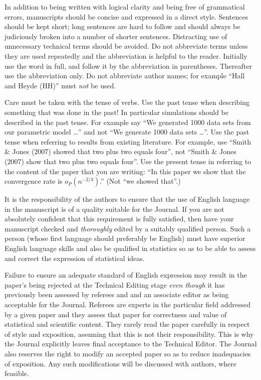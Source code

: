 \documentclass[times, doublespace]{anzsauth}
\begin{document}
In addition to being written with logical clarity and being free
of grammatical errors, manuscripts should be concise and expressed
in a direct style. Sentences should be kept short; long sentences
are hard to follow and should always be judiciously broken into
a number of shorter sentences.  Distracting use of unnecessary
technical terms should be avoided.  Do not abbreviate terms
unless they are used repeatedly and the abbreviation is helpful
to the reader. Initially use the word in full, and follow it by
the abbreviation in parentheses.  Thereafter use the abbreviation
only. Do not abbreviate author names; for example ``Hall and Heyde
(HH)'' must \emph{not} be used.

Care must be taken with the tense of verbs.  Use the past tense
when describing something that was done in the past! In particular
simulations should be described in the past tense.  For example say
``We generated 1000 data sets from our parametric model \ldots''
and not ``We generate 1000 data sets \ldots''.  Use the past tense
when referring to results from existing literature.  For example,
use ``Smith \& Jones (2007) showed that two plus two equals four'',
not ``Smith \& Jones (2007) show that two plus two equals four''.
Use the present tense in referring to the content of the paper that
you are writing: ``In this paper we show that the convergence rate
is $o_P(n^{-2/3})$.''  (Not ``we showed that''.)

It is the responsibility of the authors to ensure that the use
of English language in the manuscript is of a quality suitable
for the Journal. If you are not absolutely confident that this
requirement is fully satisfied, then have your manuscript checked
and \emph{thoroughly} edited by a suitably qualified person.
Such a person (whose first language should preferably be English)
must have superior English language skills and also be qualified
in statistics so as to be able to assess and correct the expression
of statistical ideas.

Failure to ensure an adequate standard of English expression may
result in the paper's being rejected at the Technical Editing stage
\emph{even though} it has previously been assessed by referees
and and an associate editor as being acceptable for the Journal.
Referees are experts in the particular field addressed by a given
paper and they assess that paper for correctness and value of
statistical and scientific content. They rarely read the paper
carefully in respect of style and exposition, assuming that this is
not their responsibility.  This is why the Journal explicitly leaves
final acceptance to the Technical Editor.  The Journal also reserves
the right to modify an accepted paper so as to reduce inadequacies of
exposition.  Any such modifications will be discussed with authors,
where feasible.
\end{document}
